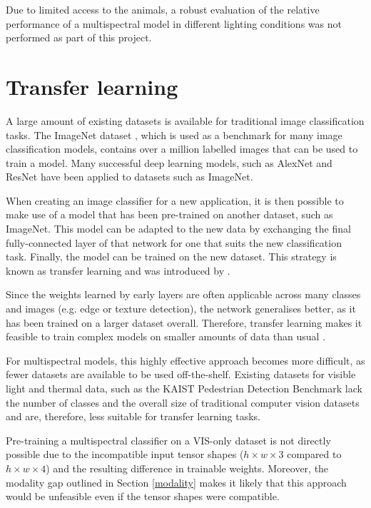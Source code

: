 \documentclass{l4proj}
\begin{document}
Due to limited access to the animals, a robust evaluation of the relative performance of a multispectral model in different lighting conditions was not performed as part of this project.


\section{Transfer learning}
\label{transfer_learning_analysis}

A large amount of existing datasets is available for traditional image classification tasks. The ImageNet dataset \citep{deng_imagenet_2009}, which is used as a benchmark for many image classification models, contains over a million labelled images that can be used to train a model. Many successful deep learning models, such as AlexNet \citep{krizhevsky_imagenet_2012} and ResNet \citep{he_deep_2016} have been applied to datasets such as ImageNet.

When creating an image classifier for a new application, it is then possible to make use of a model that has been pre-trained on another dataset, such as ImageNet. This model can be adapted to the new data by exchanging the final fully-connected layer of that network for one that suits the new classification task. Finally, the model can be trained on the new dataset. This strategy is known as transfer learning and was introduced by \citet{thrun_is_1996}.

Since the weights learned by early layers are often applicable across many classes and images (e.g. edge or texture detection), the network generalises better, as it has been trained on a larger dataset overall. Therefore, transfer learning makes it feasible to train complex models on smaller amounts of data than usual \citep{kwasniewska_deep_2017}.

For multispectral models, this highly effective approach becomes more difficult, as fewer datasets are available to be used off-the-shelf. Existing datasets for visible light and thermal data, such as the KAIST Pedestrian Detection Benchmark \citep{hwang_multispectral_2015} lack the number of classes and the overall size of traditional computer vision datasets and are, therefore, less suitable for transfer learning tasks.

Pre-training a multispectral classifier on a VIS-only dataset is not directly possible due to the incompatible input tensor shapes ($h \times w \times 3$ compared to $h \times w \times 4$) and the resulting difference in trainable weights. Moreover, the modality gap outlined in Section \ref{modality} makes it likely that this approach would be unfeasible even if the tensor shapes were compatible.
\end{document}
